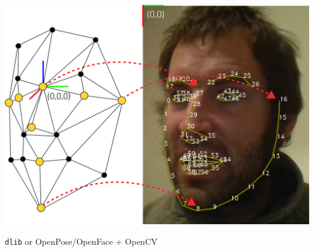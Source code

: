 \documentclass[compress]{beamer}
\begin{document}
\begin{frame}[plain]{}
    \begin{center}
        \includegraphics[width=0.8\linewidth]{head_pose2}

    {\tt dlib} or OpenPose/OpenFace + OpenCV

    \end{center}
\end{frame}
\end{document}
